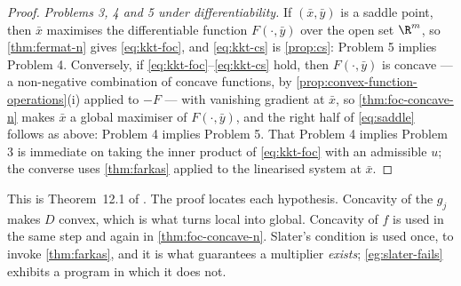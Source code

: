 \begin{proof}
	\emph{Problems 3, 4 and 5 under differentiability.} If $(\bar x,\bar y)$ is a
	saddle point, then $\bar x$ maximises the differentiable function
	$F(\cdot,\bar y)$ over the open set $\R^m$, so \autoref{thm:fermat-n} gives
	\eqref{eq:kkt-foc}, and \eqref{eq:kkt-cs} is \autoref{prop:cs}: Problem 5
	implies Problem 4. Conversely, if \eqref{eq:kkt-foc}--\eqref{eq:kkt-cs} hold,
	then $F(\cdot,\bar y)$ is concave --- a non-negative combination of concave
	functions, by \autoref{prop:convex-function-operations}(i) applied to $-F$ ---
	with vanishing gradient at $\bar x$, so \autoref{thm:foc-concave-n} makes
	$\bar x$ a global maximiser of $F(\cdot,\bar y)$, and the right half of
	\eqref{eq:saddle} follows as above: Problem 4 implies Problem 5. That Problem 4
	implies Problem 3 is immediate on taking the inner product of
	\eqref{eq:kkt-foc} with an admissible $u$; the converse uses
	\autoref{thm:farkas} applied to the linearised system at $\bar x$.
\end{proof}

This is Theorem~12.1 of \textcite[p.~436]{fukuda2026notes}
\autocite[slide 20]{fukuda2026optimization}. The proof locates each hypothesis.
Concavity of the $g_j$ makes $D$ convex, which is what turns local into global.
Concavity of $f$ is used in the same step and again in
\autoref{thm:foc-concave-n}. Slater's condition is used once, to invoke
\autoref{thm:farkas}, and it is what guarantees a multiplier \emph{exists};
\autoref{eg:slater-fails} exhibits a program in which it does not.

